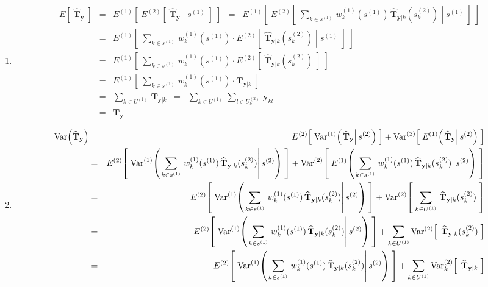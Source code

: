 \documentclass{article}
\begin{document}
\proof
\begin{enumerate}
\item
\begin{eqnarray*}
E\!\left[\;\widehat{\mathbf{T}}_{\mathbf{y}}\;\right]
&=& E^{(1)}\!\left[\;E^{(2)}\!\left[\;\left.\widehat{\mathbf{T}}_{\mathbf{y}}\;\right\vert\;s^{(1)}\;\right]\;\right]
\;\;=\;\; E^{(1)}\!\left[\;E^{(2)}\!\left[\;\left.
\sum_{k\in s^{(1)}}\,w^{(1)}_{k}(s^{(1)})\,\widehat{\mathbf{T}}_{\mathbf{y}\vert k}(s^{(2)}_{k})
\;\right\vert\;s^{(1)}\;\right]\;\right] \\
&=& E^{(1)}\!\left[\;
\sum_{k\in s^{(1)}}\,w^{(1)}_{k}(s^{(1)})
\cdot
E^{(2)}\!\left[\;\left.
\widehat{\mathbf{T}}_{\mathbf{y}\vert k}(s^{(2)}_{k})
\;\right\vert\;s^{(1)}\;\right]\;\right] \\
&=& E^{(1)}\!\left[\;
\sum_{k\in s^{(1)}}\,w^{(1)}_{k}(s^{(1)})
\cdot
E^{(2)}\!\left[\;\widehat{\mathbf{T}}_{\mathbf{y}\vert k}(s^{(2)}_{k})\;\right]
\;\right] \\
&=& E^{(1)}\!\left[\;
\sum_{k\in s^{(1)}}\,w^{(1)}_{k}(s^{(1)})
\cdot
\mathbf{T}_{\mathbf{y}\vert k}
\;\right] \\
&=&
\sum_{k\in U^{(1)}}\,\mathbf{T}_{\mathbf{y}\vert k}
\;\;=\;\;
\sum_{k\in U^{(1)}}\,\sum_{l \in U^{(2)}_{k}}\,\mathbf{y}_{kl}
\\
&=&
\mathbf{T}_{\mathbf{y}}
\end{eqnarray*}

\item
\begin{eqnarray*}
\Var\!\left(\widehat{\mathbf{T}}_{\mathbf{y}}\right)
&=&
E^{(2)}\!\left[\;\Var^{(1)}\!\left(\left.\widehat{\mathbf{T}}_{\mathbf{y}}\right\vert s^{(2)}\right)\;\right]
+
\Var^{(2)}\!\left[\;E^{(1)}\!\left(\left.\widehat{\mathbf{T}}_{\mathbf{y}}\right\vert s^{(2)}\right)\;\right] \\
&=&
E^{(2)}\!\left[\;\Var^{(1)}\!\left(\left.
\sum_{k\in s^{(1)}}\,w^{(1)}_{k}(s^{(1)})\,\widehat{\mathbf{T}}_{\mathbf{y}\vert k}(s^{(2)}_{k})
\right\vert s^{(2)}\right)\;\right]
+
\Var^{(2)}\!\left[\;E^{(1)}\!\left(\left.
\sum_{k\in s^{(1)}}\,w^{(1)}_{k}(s^{(1)})\,\widehat{\mathbf{T}}_{\mathbf{y}\vert k}(s^{(2)}_{k})
\right\vert s^{(2)}\right)\;\right]
\\
&=&
E^{(2)}\!\left[\;\Var^{(1)}\!\left(\left.
\sum_{k\in s^{(1)}}\,w^{(1)}_{k}(s^{(1)})\,\widehat{\mathbf{T}}_{\mathbf{y}\vert k}(s^{(2)}_{k})
\right\vert s^{(2)}\right)\;\right]
+
\Var^{(2)}\!\left[\;
\sum_{k\in U^{(1)}}\,\widehat{\mathbf{T}}_{\mathbf{y}\vert k}(s^{(2)}_{k})
\;\right]
\\
&=&
E^{(2)}\!\left[\;\Var^{(1)}\!\left(\left.
\sum_{k\in s^{(1)}}\,w^{(1)}_{k}(s^{(1)})\,\widehat{\mathbf{T}}_{\mathbf{y}\vert k}(s^{(2)}_{k})
\right\vert s^{(2)}\right)\;\right]
+
\sum_{k\in U^{(1)}}
\Var^{(2)}\!\left[\;
\,\widehat{\mathbf{T}}_{\mathbf{y}\vert k}(s^{(2)}_{k})
\;\right]
\\
&=&
E^{(2)}\!\left[\;\Var^{(1)}\!\left(\left.
\sum_{k\in s^{(1)}}\,w^{(1)}_{k}(s^{(1)})\,\widehat{\mathbf{T}}_{\mathbf{y}\vert k}(s^{(2)}_{k})
\right\vert s^{(2)}\right)\;\right]
+
\sum_{k\in U^{(1)}}\Var^{(2)}_{k}\!\left[\;\,\widehat{\mathbf{T}}_{\mathbf{y}\vert k}\;\right]
\\
\end{eqnarray*}


\end{enumerate}
\end{document}

